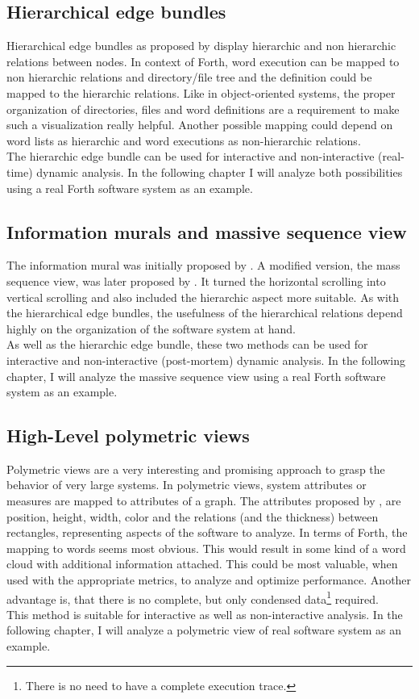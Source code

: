 \subsection*{Hierarchical edge bundles}
Hierarchical edge bundles as proposed by \cite{Holten:2006:HEB:1187627.1187772} display hierarchic and non hierarchic relations between nodes. In context of Forth, word execution can be mapped to non hierarchic relations and directory/file tree and the definition could be mapped to the hierarchic relations. Like in object-oriented systems, the proper organization of directories, files and word definitions are a requirement to make such a visualization really helpful.
Another possible mapping could depend on word lists as hierarchic and word executions as non-hierarchic relations.
\\
The hierarchic edge bundle can be used for interactive and non-interactive (real-time) dynamic analysis. In the following chapter I will analyze both possibilities using a real Forth software system as an example.

\subsection*{Information murals and massive sequence view}
The information mural was initially proposed by \cite{Jerding:1998:IMT:614271.614408}. A modified version, the mass sequence view, was later proposed by \cite{Cornelissen2009}. It turned the horizontal scrolling into vertical scrolling and also included the hierarchic aspect more suitable. As with the hierarchical edge bundles, the usefulness of the hierarchical relations depend highly on the organization of the software system at hand.
\\
As well as the hierarchic edge bundle, these two methods can be used for interactive and non-interactive (post-mortem) dynamic analysis. In the following chapter, I will analyze the massive sequence view using a real Forth software system as an example.

\subsection*{High-Level polymetric views}
Polymetric views\cite{Ducasse:2004:HPV:977397.977739} are a very interesting and promising approach to grasp the behavior of very large systems. In polymetric views, system attributes or measures are mapped to attributes of a graph. The attributes proposed by \cite{Ducasse:2004:HPV:977397.977739}, are position, height, width, color and the relations (and the thickness) between rectangles, representing aspects of the software to analyze. In terms of Forth, the mapping to words seems most obvious. This would result in some kind of a word cloud with additional information attached. This could be most valuable, when used with the appropriate metrics, to analyze and optimize performance. Another advantage is, that there is no complete, but only condensed data\footnote{There is no need to have a complete execution trace.} required.
\\
This method is suitable for interactive as well as non-interactive analysis. In the following chapter, I will analyze a polymetric view of real software system as an example.


